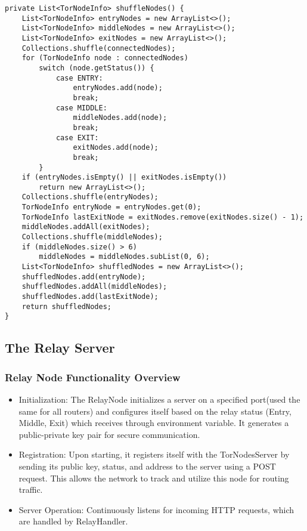 \documentclass[sigconf]{acmart}
\begin{document}
\begin{lstlisting}[caption=The Routing Algorithm]
private List<TorNodeInfo> shuffleNodes() {
    List<TorNodeInfo> entryNodes = new ArrayList<>();
    List<TorNodeInfo> middleNodes = new ArrayList<>();
    List<TorNodeInfo> exitNodes = new ArrayList<>();
    Collections.shuffle(connectedNodes);
    for (TorNodeInfo node : connectedNodes)
        switch (node.getStatus()) {
            case ENTRY:
                entryNodes.add(node);
                break;
            case MIDDLE:
                middleNodes.add(node);
                break;
            case EXIT:
                exitNodes.add(node);
                break;
        }
    if (entryNodes.isEmpty() || exitNodes.isEmpty())
        return new ArrayList<>();
    Collections.shuffle(entryNodes);
    TorNodeInfo entryNode = entryNodes.get(0);
    TorNodeInfo lastExitNode = exitNodes.remove(exitNodes.size() - 1);
    middleNodes.addAll(exitNodes);
    Collections.shuffle(middleNodes);
    if (middleNodes.size() > 6)
        middleNodes = middleNodes.subList(0, 6);
    List<TorNodeInfo> shuffledNodes = new ArrayList<>();
    shuffledNodes.add(entryNode);
    shuffledNodes.addAll(middleNodes);
    shuffledNodes.add(lastExitNode);
    return shuffledNodes;
}
\end{lstlisting}

\subsection{The Relay Server}
\subsubsection{Relay Node Functionality Overview}
\begin{itemize}
    \item Initialization: The RelayNode initializes a server on a specified port(used the same for all routers) and configures itself based on the relay status (Entry, Middle, Exit) which receives through environment variable. It generates a public-private key pair for secure communication.
    \item Registration: Upon starting, it registers itself with the TorNodesServer by sending its public key, status, and address to the server using a POST request. This allows the network to track and utilize this node for routing traffic.
    \item Server Operation: Continuously listens for incoming HTTP requests, which are handled by RelayHandler.
\end{itemize}
\end{document}
